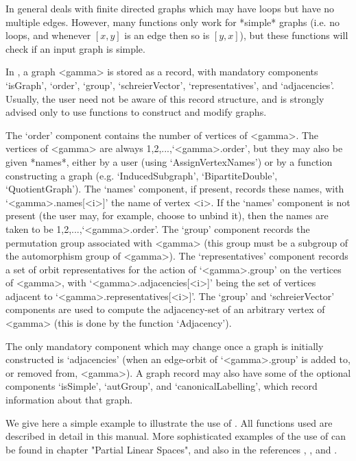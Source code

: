 In general {\GRAPE} deals with finite directed graphs which may have
loops but have no multiple edges. However, many {\GRAPE} functions only
work for *simple* graphs (i.e. no loops, and whenever $[x,y]$ is an
edge then so is $[y,x]$), but these functions will check if an input
graph is simple.

In {\GRAPE}, a graph <gamma> is stored as a record, with mandatory
components `isGraph', `order', `group', `schreierVector',
`representatives', and `adjacencies'. Usually, the user need not be
aware of this record structure, and is strongly advised only to use
{\GRAPE} functions to construct and modify graphs.

The `order' component contains the number of vertices of <gamma>. The
vertices of <gamma> are always 1,2,...,`<gamma>.order', but they may also
be given *names*, either by a user (using `AssignVertexNames') or by a
function constructing a graph (e.g. `InducedSubgraph', `BipartiteDouble',
`QuotientGraph'). The `names' component, if present, records these
names, with `<gamma>.names[<i>]' the name of vertex <i>.  If the `names'
component is not present (the user may, for example, choose to unbind
it), then the names are taken to be 1,2,...,`<gamma>.order'. The `group'
component records the {\GAP} permutation group associated with <gamma>
(this group must be a subgroup of the automorphism group of <gamma>). The
`representatives' component records a set of orbit representatives
for the action of `<gamma>.group' on the vertices of <gamma>, with
`<gamma>.adjacencies[<i>]' being the set of vertices adjacent to
`<gamma>.representatives[<i>]'. The `group' and `schreierVector'
components are used to compute the adjacency-set of an arbitrary vertex
of <gamma> (this is done by the function `Adjacency').

The only mandatory component which may change once a graph is initially
constructed is `adjacencies' (when an edge-orbit of `<gamma>.group' is
added to, or removed from, <gamma>). A graph record may also have some
of the optional components `isSimple', `autGroup', and
`canonicalLabelling', which record information about that graph.


We give here a simple example to illustrate the use of {\GRAPE}. All
functions used are described in detail in this manual. More
sophisticated examples of the use of {\GRAPE} can be found in
chapter "Partial Linear Spaces", and also in the references \cite{Cam99},
\cite{CSS99}, \cite{HL99} and \cite{Soi06}.

